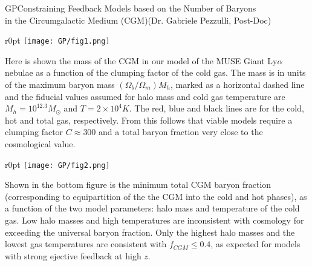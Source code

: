 \begin{section}{GP}{Constraining Feedback Models based on the Number of Baryons \\
   \hspace*{4cm} in the Circumgalactic Medium (CGM)}{(Dr. Gabriele Pezzulli, Post-Doc)}
  \begin{minipage}{\linewidth}
    \begin{wrapfigure}{r}{0pt}
      \texttt{[image: GP/fig1.png]}
    \end{wrapfigure}
    \strut {\small Here is shown the mass of the CGM in our model of the MUSE
      Giant Ly$\alpha$ nebulae as a function of the clumping factor of the cold
      gas. The mass is in units of the maximum baryon mass
      $(\Omega_b/\Omega_m)M_h$, marked as a horizontal dashed line and the
      fiducial values assumed for halo mass and cold gas temperature are $M_h =
      10^{12.3} M_{\odot}$ and $T=2 \times 10^4 K$. The red, blue and black
      lines are for the cold, hot and total gas, respectively. From this follows
      that viable models require a clumping factor $C \approx 300$ and a total
      baryon fraction very close to the cosmological value.}
  \end{minipage}

  \vspace{0.7cm}

  \begin{minipage}{\linewidth}
    \begin{wrapfigure}{r}{0pt}
      \texttt{[image: GP/fig2.png]}
    \end{wrapfigure}
    \strut {\small Shown in the bottom figure is the minimum total CGM baryon
      fraction (corresponding to equipartition of the the CGM into the cold and
      hot phases), as a function of the two model parameters: halo mass and
      temperature of the cold gas. Low halo masses and high temperatures are
      inconsistent with cosmology for exceeding the universal baryon fraction.
      Only the highest halo masses and the lowest gas temperatures are
      consistent with $f_{CGM} \leq 0.4$, as expected for models with strong ejective
      feedback at high $z$.}
  \end{minipage}
\end{section}